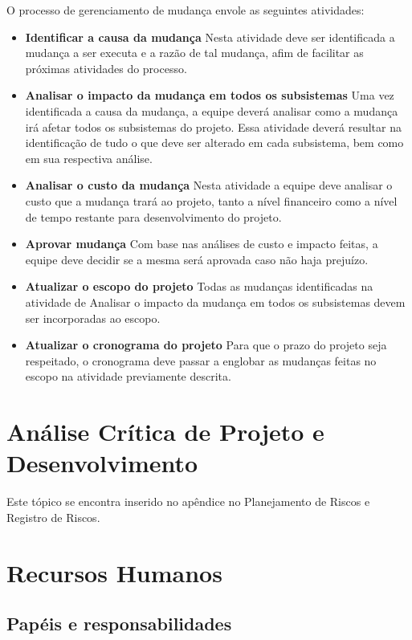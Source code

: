     O processo de gerenciamento de mudança envole as seguintes atividades:
\begin{itemize}
    \item \textbf{Identificar a causa da mudança}
        Nesta atividade deve ser identificada a mudança a ser executa e a razão de tal mudança, afim de facilitar as próximas atividades do processo.

    \item \textbf{Analisar o impacto da mudança em todos os subsistemas}
        Uma vez identificada a causa da mudança, a equipe deverá analisar como a mudança irá afetar todos os subsistemas do projeto. Essa atividade deverá resultar na identificação de tudo o que deve ser alterado em cada subsistema, bem como em sua respectiva análise.

    \item \textbf{Analisar o custo da mudança}
        Nesta atividade a equipe deve analisar o custo que a mudança trará ao projeto, tanto a nível financeiro como a nível de tempo restante para desenvolvimento do projeto.

    \item\textbf{Aprovar mudança}
        Com base nas análises de custo e impacto feitas, a equipe deve decidir se a mesma será aprovada caso não haja prejuízo.

    \item \textbf{Atualizar o escopo do projeto}
        Todas as mudanças identificadas na atividade de Analisar o impacto da mudança em todos os subsistemas devem ser incorporadas ao escopo.

    \item \textbf{Atualizar o cronograma do projeto}
        Para que o prazo do projeto seja respeitado, o cronograma deve passar a englobar as mudanças feitas no escopo na atividade previamente descrita.

\end{itemize}

\section{Análise Crítica de Projeto e Desenvolvimento}
    Este tópico se encontra inserido no apêndice no Planejamento de Riscos e Registro de Riscos.

\section{Recursos Humanos}
\subsection{Papéis e responsabilidades}

